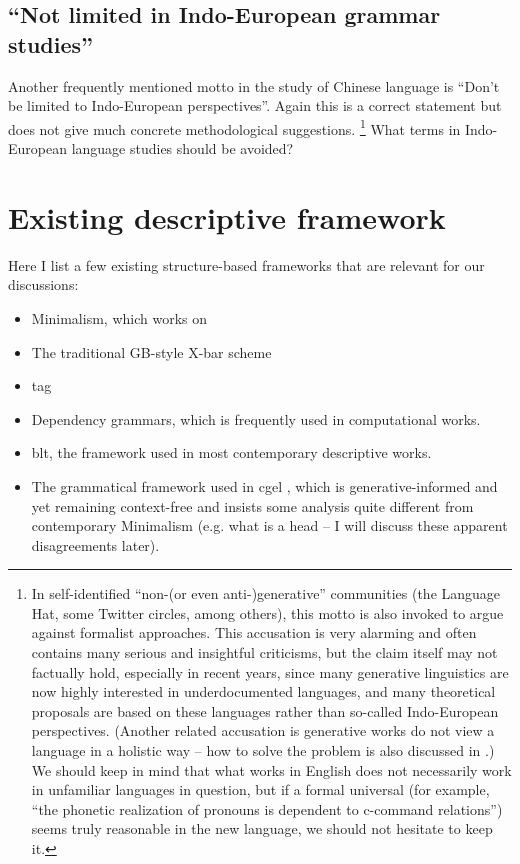 \documentclass[../main.tex]{subfiles}
\begin{document}
\subsection{``Not limited in Indo-European grammar studies''}

Another frequently mentioned motto in the study of Chinese language is ``Don't be limited to Indo-European
perspectives''. Again this is a correct statement but does not give much concrete methodological suggestions.%
\footnote{
    In self-identified ``non-(or even anti-)generative'' communities (the Language Hat, some Twitter circles, 
    among others), this motto is also invoked to argue against formalist approaches. This accusation is very alarming and often contains many serious and insightful criticisms, but the claim itself may not factually 
    hold, especially in recent years, since many generative linguistics are now highly interested in
    underdocumented languages, and many theoretical proposals \citep{preminger2014agreement} are based on %
    these languages rather than so-called Indo-European perspectives. (Another related accusation is 
    generative works do not view a language in a holistic way -- how to solve the problem is also 
    discussed in .) We should keep in mind 
    that what works in English does not necessarily work in unfamiliar languages in question, but if 
    a formal universal (for example, ``the phonetic realization of pronouns is dependent to c-command relations'')
    seems truly reasonable in the new language, we should not hesitate to keep it.
}%
What terms in Indo-European language studies should be avoided?   

\section{Existing descriptive framework}\label{sec:descriptive-framework}

Here I list a few existing structure-based frameworks that are relevant for our discussions:
\begin{itemize}
    \item Minimalism, which works on 
    \item The traditional GB-style X-bar scheme
    \item \ac{tag}  %
    \item Dependency grammars, which is frequently used in computational works.
    \item \ac{blt}, the framework used in most contemporary descriptive works.
    \item The grammatical framework used in \ac{cgel} \citep{cgel,pullum2008expressive}, which is generative-informed and yet remaining 
    context-free and insists some analysis quite different from contemporary Minimalism (e.g. 
    what is a head -- I will discuss these apparent disagreements later).
\end{itemize}
\end{document}
